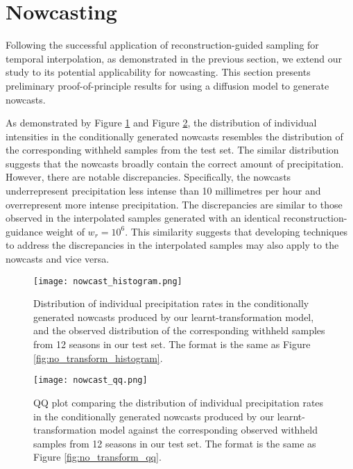 \documentclass[ oneside,%
                    author={George Herbert},
                    degree={MSci},
                     title={Diffusion Models for Time-Evolving Precipitation Fields},
                  subtitle={}]{dissertation}
\begin{document}
\section{Nowcasting}
\label{sec:results_nowcasting}

Following the successful application of reconstruction-guided sampling for temporal interpolation, as demonstrated in the previous section, we extend our study to its potential applicability for nowcasting. This section presents preliminary proof-of-principle results for using a diffusion model to generate nowcasts.

As demonstrated by Figure \ref{fig:nowcast_histogram} and Figure \ref{fig:nowcast_qq}, the distribution of individual intensities in the conditionally generated nowcasts resembles the distribution of the corresponding withheld samples from the test set. The similar distribution suggests that the nowcasts broadly contain the correct amount of precipitation. However, there are notable discrepancies. Specifically, the nowcasts underrepresent precipitation less intense than 10 millimetres per hour and overrepresent more intense precipitation. The discrepancies are similar to those observed in the interpolated samples generated with an identical reconstruction-guidance weight of $w_r=10^6$. This similarity suggests that developing techniques to address the discrepancies in the interpolated samples may also apply to the nowcasts and vice versa.

\begin{figure}[htbp]
      \centering
      \texttt{[image: nowcast\_histogram.png]}
      \caption{Distribution of individual precipitation rates in the conditionally generated nowcasts produced by our learnt-transformation model, and the observed distribution of the corresponding withheld samples from 12 seasons in our test set. The format is the same as Figure \ref{fig:no_transform_histogram}.}
      \label{fig:nowcast_histogram}
\end{figure}

\begin{figure}[htbp]
      \centering
      \texttt{[image: nowcast\_qq.png]}
      \caption{QQ plot comparing the distribution of individual precipitation rates in the conditionally generated nowcasts produced by our learnt-transformation model against the corresponding observed withheld samples from 12 seasons in our test set. The format is the same as Figure \ref{fig:no_transform_qq}.}
      \label{fig:nowcast_qq}
\end{figure}
\end{document}
